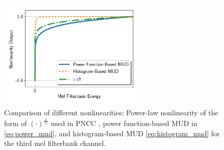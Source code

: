 \documentclass[a4paper]{article}
\begin{document}
\begin{figure}[tbp]
  \begin{center}
    \includegraphics[width=70mm]{nonlinearity_comparison}
      \caption { 
      \label{fig:nonlinearity_comparison}
      Comparison of different nonlinearities:
      Power-law nonlinearity of the form of $(\cdot)^{\frac{1}{15}}$
      used in PNCC \cite{C_Kim_IEEETran_2016_1, C_Kim_ICASSP_2012_1},
      power function-based MUD in \eqref{eq:power_mud}, 
      and histogram-based MUD \eqref{eq:histogram_mud} for the
      third mel filterbank channel. 
      }
  \vspace{-7mm}
  \end{center}
\end{figure}
%
%
\end{document}
